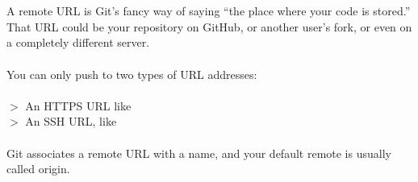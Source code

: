 \\
\\
A remote URL is Git's fancy way of saying ``the place where your
code is stored.'' That URL could be your repository on GitHub, or
another user's fork, or even on a completely different server.
\\
\\
You can only push to two types of URL addresses:
\\
\\
$>$ An HTTPS URL like \\
$>$ An SSH URL, like \\
\\
Git associates a remote URL with a name, and your default remote is usually called origin.




